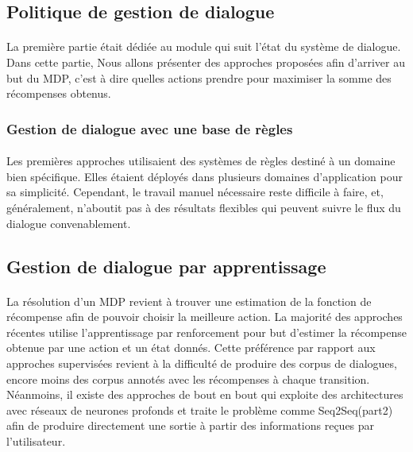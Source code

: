 	\subsection{Politique de gestion de dialogue}
		\paragraph{}
		La première partie était dédiée au module qui suit l’état du système de dialogue. Dans cette partie, Nous allons présenter des approches proposées afin d’arriver au but du MDP, c’est à dire quelles actions prendre pour maximiser la somme des récompenses obtenus.
		\subsubsection{Gestion de dialogue avec une base de règles}
		\paragraph{}
		Les premières approches utilisaient des systèmes de règles destiné à un domaine bien spécifique. Elles étaient déployés dans plusieurs domaines d’application pour sa simplicité. Cependant, le travail manuel nécessaire reste difficile à faire, et, généralement, n’aboutit pas à des résultats flexibles qui peuvent suivre le flux du dialogue convenablement\cite{Lee2010}.
	\subsection{Gestion de dialogue par apprentissage}
		\paragraph{}
		La résolution d’un MDP revient à trouver une estimation de la fonction de récompense afin de pouvoir choisir la meilleure action. La majorité des approches récentes utilise l’apprentissage par renforcement pour but d’estimer la récompense obtenue par une action et un état donnés. Cette préférence par rapport aux approches supervisées revient à la difficulté de produire des corpus de dialogues\cite{Henderson2008}, encore moins des corpus annotés avec les récompenses à chaque transition. Néanmoins, il existe des approches de bout en bout qui exploite des architectures avec réseaux de neurones profonds et traite le problème comme Seq2Seq(part2) afin de produire directement une sortie à partir des informations reçues par l’utilisateur\cite{Wen2017}\cite{Serban2016}.



